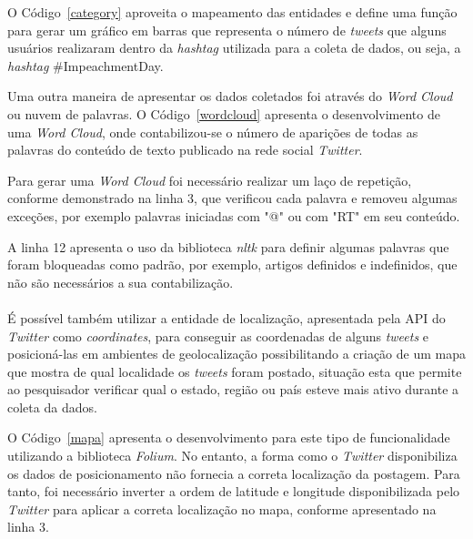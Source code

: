 

O Código~\ref{category} aproveita o mapeamento das entidades e define uma função para gerar um gráfico em barras que representa o número de \textit{tweets} que alguns usuários realizaram dentro da \textit{hashtag} utilizada para a coleta de dados, ou seja, a \textit{hashtag} \#ImpeachmentDay.



Uma outra maneira de apresentar os dados coletados foi através do \textit{Word Cloud} ou nuvem de palavras. O Código~\ref{wordcloud} apresenta o desenvolvimento de uma \textit{Word Cloud}, onde contabilizou-se o número de aparições de todas as palavras do conteúdo de texto publicado na rede social \textit{Twitter}.

Para gerar uma \textit{Word Cloud} foi necessário realizar um laço de repetição, conforme demonstrado na linha 3, que verificou cada palavra e removeu algumas exceções, por exemplo palavras iniciadas com "@" \space ou com "RT" \space em seu conteúdo.

A linha 12 apresenta o uso da biblioteca \textit{nltk} para definir algumas palavras que foram bloqueadas como padrão, por exemplo, artigos definidos e indefinidos, que não são necessários a sua contabilização. \\ \\



É possível também utilizar a entidade de localização, apresentada pela API do \textit{Twitter} como \textit{coordinates}, para conseguir as coordenadas de alguns \textit{tweets} e posicioná-las em ambientes de geolocalização possibilitando a criação de um mapa que mostra de qual localidade os \textit{tweets} foram postado, situação esta que permite ao pesquisador verificar qual o estado, região ou país esteve mais ativo durante a coleta da dados.

O Código~\ref{mapa} apresenta o desenvolvimento para este tipo de funcionalidade utilizando a biblioteca \textit{Folium}. No entanto, a forma como o \textit{Twitter} disponibiliza os dados de posicionamento não fornecia a correta localização da postagem. Para tanto, foi necessário inverter a ordem de latitude e longitude disponibilizada pelo \textit{Twitter} para aplicar a correta localização no mapa, conforme apresentado na linha 3.

